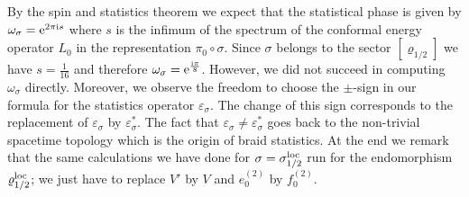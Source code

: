 \documentclass[10pt,a4paper]{article}
\begin{document}
By the spin and statistics theorem \cite{FRS2} we
expect that the statistical phase is given by
$\omega_\sigma={\rm e}^{2\pi{\rm i} s}$ where $s$ is the infimum
of the spectrum of the conformal energy operator $L_0$
in the representation $\pi_0\circ\sigma$. Since
$\sigma$ belongs to the sector $[\varrho_{1/2}]$ we
have $s=\frac{1}{16}$ and therefore
$\omega_\sigma={\rm e}^\frac{{\rm i}\pi}{8}$. However,
we did not succeed in computing $\omega_\sigma$
directly. Moreover, we observe the freedom to choose
the $\pm$-sign in our formula for the statistics
operator $\varepsilon_\sigma$. The change of this
sign corresponds to the replacement of
$\varepsilon_\sigma$ by $\varepsilon_\sigma^*$.
The fact that
$\varepsilon_\sigma\neq\varepsilon_\sigma^*$
goes back to the non-trivial spacetime topology
which is the origin of braid statistics. At the
end we remark that the same calculations we have
done for $\sigma=\sigma_{1/2}^{\rm loc}$ run for the
endomorphism $\varrho_{1/2}^{\rm loc}$; we just have
to replace $V'$ by $V$ and $e_0^{(2)}$ by $f_0^{(2)}$.
\end{document}
